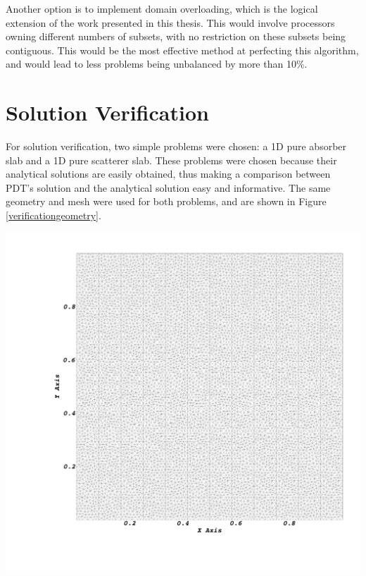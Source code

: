 Another option is to implement domain overloading, which is the logical extension of the work presented in this thesis. This would involve processors owning different numbers of subsets, with no restriction on these subsets being contiguous. This would be the most effective method at perfecting this algorithm, and would lead to less problems being unbalanced by more than 10\%.

\section{Solution Verification}

For solution verification, two simple problems were chosen: a 1D pure absorber slab and a 1D pure scatterer slab. These problems were chosen because their analytical solutions are easily obtained, thus making a comparison between PDT's solution and the analytical solution easy and informative. The same geometry and mesh were used for both problems, and are shown in Figure \ref{verificationgeometry}.

\noindent\begin{minipage}{\textwidth}
\centering
\includegraphics[scale = 0.12,trim = 10cm 10cm 0cm 0cm ]{figures/solutionmesh.png}
\label{verificationgeometry}
\end{minipage}
\smallskip

